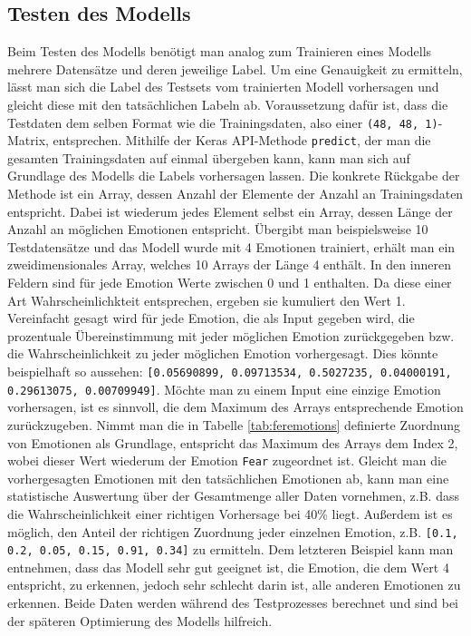 \documentclass[12pt, a4paper]{report}
\begin{document}
\subsection{Testen des Modells}
Beim Testen des Modells benötigt man analog zum Trainieren eines Modells mehrere Datensätze und deren jeweilige Label. Um eine Genauigkeit zu ermitteln, lässt man sich die Label des Testsets vom trainierten Modell vorhersagen und gleicht diese mit den tatsächlichen Labeln ab. Voraussetzung dafür ist, dass die Testdaten dem selben Format wie die Trainingsdaten, also einer \texttt{(48, 48, 1)}-Matrix, entsprechen. Mithilfe der Keras API-Methode \texttt{predict}, der man die gesamten Trainingsdaten auf einmal übergeben kann, kann man sich auf Grundlage des Modells die Labels vorhersagen lassen. Die konkrete Rückgabe der Methode ist ein Array, dessen Anzahl der Elemente der Anzahl an Trainingsdaten entspricht. Dabei ist wiederum jedes Element selbst ein Array, dessen Länge der Anzahl an möglichen Emotionen entspricht. Übergibt man beispielsweise 10 Testdatensätze und das Modell wurde mit 4 Emotionen trainiert, erhält man ein zweidimensionales Array, welches 10 Arrays der Länge 4 enthält. In den inneren Feldern sind für jede Emotion Werte zwischen 0 und 1 enthalten. Da diese einer Art Wahrscheinlichkteit entsprechen, ergeben sie kumuliert den Wert 1. Vereinfacht gesagt wird für jede Emotion, die als Input gegeben wird, die prozentuale Übereinstimmung mit jeder möglichen Emotion zurückgegeben bzw. die Wahrscheinlichkeit zu jeder möglichen Emotion vorhergesagt. Dies könnte beispielhaft so aussehen: \texttt{[0.05690899, 0.09713534, 0.5027235,  0.04000191, 0.29613075, 0.00709949]}. Möchte man zu einem Input eine einzige Emotion vorhersagen, ist es sinnvoll, die dem Maximum des Arrays entsprechende Emotion zurückzugeben. Nimmt man die in Tabelle \ref{tab:feremotions} definierte Zuordnung von Emotionen als Grundlage, entspricht das Maximum des Arrays dem Index 2, wobei dieser Wert wiederum der Emotion \texttt{Fear} zugeordnet ist.\newline
Gleicht man die vorhergesagten Emotionen mit den tatsächlichen Emotionen ab, kann man eine statistische Auswertung über der Gesamtmenge aller Daten vornehmen, z.B. dass die Wahrscheinlichkeit einer richtigen Vorhersage bei 40\% liegt. Außerdem ist es möglich, den Anteil der richtigen Zuordnung jeder einzelnen Emotion, z.B. \texttt{[0.1, 0.2, 0.05, 0.15, 0.91, 0.34]} zu ermitteln. Dem letzteren Beispiel kann man entnehmen, dass das Modell sehr gut geeignet ist, die Emotion, die dem Wert 4 entspricht, zu erkennen, jedoch sehr schlecht darin ist, alle anderen Emotionen zu erkennen. Beide Daten werden während des Testprozesses berechnet und sind bei der späteren Optimierung des Modells hilfreich.
\end{document}
